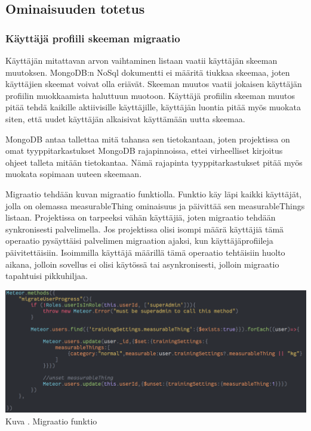 \subsection{Ominaisuuden totetus}


\subsubsection{Käyttäjä profiili skeeman migraatio}



Käyttäjän mitattavan arvon vaihtaminen listaan vaatii käyttäjän skeeman muutoksen.
MongoDB:n NoSql dokumentti ei määritä tiukkaa skeemaa, joten käyttäjien skeemat voivat olla eriävät.
Skeeman muutos vaatii jokaisen käyttäjän profiilin muokkaamista haluttuun muotoon.
Käyttäjä profiilin skeeman muutos pitää tehdä kaikille aktiivisille käyttäjille, käyttäjän luontia pitää myös muokata siten, 
että uudet käyttäjän alkaisivat käyttämään uutta skeemaa.
\medskip

MongoDB antaa tallettaa mitä tahansa sen tietokantaan, joten projektissa on omat tyyppitarkastukset MongoDB rajapinnoissa, 
ettei virheelliset kirjoitus ohjeet talleta mitään tietokantaa.
Nämä rajapinta tyyppitarkastukset pitää myös muokata sopimaan uuteen skeemaan.
\medskip

Migraatio tehdään kuvan \nextImageCount {} migraatio funktiolla. 
Funktio käy läpi kaikki käyttäjät, jolla on olemassa measurableThing ominaisuus ja päivittää sen measurableThings listaan.
Projektissa on tarpeeksi vähän käyttäjiä, joten migraatio tehdään synkronisesti palvelimella. 
Jos projektissa olisi isompi määrä käyttäjiä tämä operaatio pysäyttäisi palvelimen migraation ajaksi, kun käyttäjäprofiileja päivitettäisiin.
Isoimmilla käyttäjä määrillä tämä operaatio tehtäisiin huolto aikana, jolloin sovellus ei olisi käytössä tai asynkronisesti, 
jolloin migraatio tapahtuisi pikkuhiljaa. 
\medskip

\bigskip
\includegraphics[width =15cm]{src/public/oppar/migrationfunction.png}\\
Kuva \getImgCount{}. Migraatio funktio
\medskip







